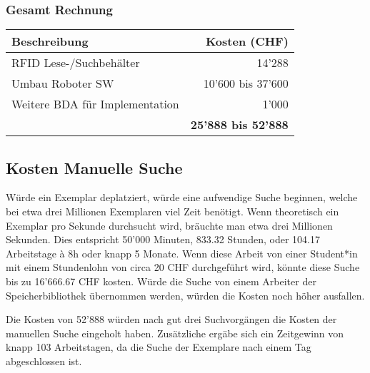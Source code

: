 \subsubsection{Gesamt Rechnung}
\begin{tabularx}{\textwidth}{|X|r|}
	\hline
	\textbf{Beschreibung} & \textbf{Kosten (CHF)} \\
	\hline
	RFID Lese-/Suchbehälter & 14'288 \\
	\hline
	Umbau Roboter SW & 10'600 bis 37'600 \\
	\hline
	Weitere BDA für Implementation & 1'000 \\
	\hline
	& \textbf{25'888 bis 52'888} \\
	\hline
\end{tabularx}

\subsection{Kosten Manuelle Suche}
Würde ein Exemplar deplatziert, würde eine aufwendige Suche beginnen, welche bei etwa drei Millionen Exemplaren viel Zeit benötigt. Wenn theoretisch ein Exemplar pro Sekunde durchsucht wird, bräuchte man etwa drei Millionen Sekunden. Dies entspricht 50'000 Minuten, 833.32 Stunden, oder 104.17 Arbeitstage à 8h oder knapp 5 Monate. Wenn diese Arbeit von einer Student*in mit einem Stundenlohn von circa 20 CHF durchgeführt wird, könnte diese Suche bis zu 16'666.67 CHF kosten. Würde die Suche von einem Arbeiter der Speicherbibliothek übernommen werden, würden die Kosten noch höher ausfallen.

Die Kosten von 52'888 würden nach gut drei Suchvorgängen die Kosten der manuellen Suche eingeholt haben. Zusätzliche ergäbe sich ein Zeitgewinn von knapp 103 Arbeitstagen, da die Suche der Exemplare nach einem Tag abgeschlossen ist.
